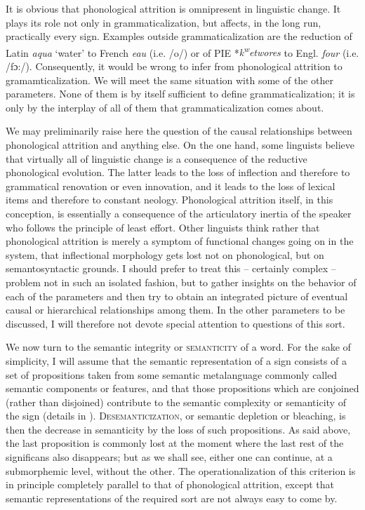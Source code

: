 It is obvious that phonological attrition is omnipresent in linguistic change. It plays its role not only in grammaticalization, but affects, in the long run, practically every sign. Examples outside grammaticalization are the reduction of Latin \textit{aqua} ‘water’ to French \textit{eau} (i.e. /o/) or of PIE *\textit{k}\textit{\textsuperscript{w}}\textit{etwores} to Engl. \textit{four} (i.e. /fɔ:/). Consequently, it would be wrong to infer from phonological attrition to gramamticalization. We will meet the same situation with some of the other parameters. None of them is by itself sufficient to define grammaticalization; it is only by the interplay of all of them that grammaticalization comes about.

We may preliminarily raise here the question of the causal relationships between phonological attrition and anything else. On the one hand, some linguists believe that virtually all of linguistic change is a consequence of the reductive phonological evolution. The latter leads to the loss of inflection and therefore to grammatical renovation or even innovation, and it leads to the loss of lexical items and therefore to constant neology. Phonological attrition itself, in this conception, is essentially a consequence of the articulatory inertia of the speaker who follows the principle of least effort. Other linguists think rather that phonological attrition is merely a symptom of functional changes going on in the system, that inflectional morphology gets lost not on phonological, but on semantosyntactic grounds. I should prefer to treat this -- certainly complex -- problem not in such an isolated fashion, but to gather insights on the behavior of each of the parameters and then try to obtain an integrated picture of eventual causal or hierarchical relationships among them. In the other parameters to be discussed, I will therefore not devote special attention to questions of this sort.

We now turn to the semantic integrity or \textsc{semanticity} of a word. For the sake of simplicity, I will assume that the semantic representation of a sign consists of a set of propositions taken from some semantic metalanguage commonly called semantic components or features, and that those propositions which are conjoined (rather than disjoined) contribute to the semantic complexity or semanticity of the sign (details in \citealt{Lehmann1978}). \textsc{Desemanticization}, or semantic depletion \citep[180f]{Weinreich1963} or bleaching, is then the decrease in semanticity by the loss of such propositions. As said above, the last proposition is commonly lost at the moment where the last rest of the significans also disappears; but as we shall see, either one can continue, at a submorphemic level, without the other. The operationalization of this criterion is in principle completely parallel to that of phonological attrition, except that semantic representations of the required sort are not always easy to come by.


